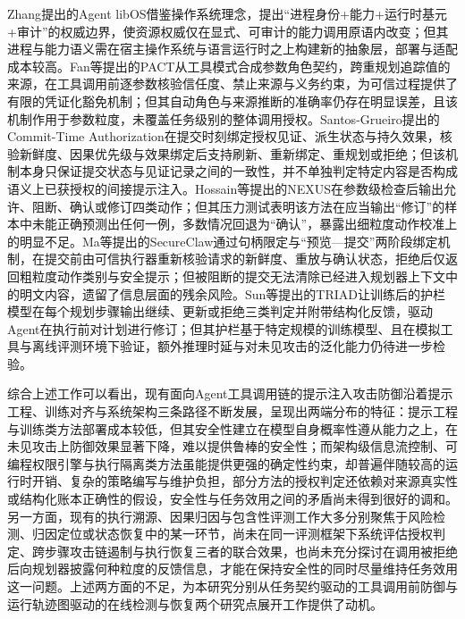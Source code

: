 Zhang\cite{zhang2026agentlibos}提出的Agent libOS借鉴操作系统理念，提出“进程身份+能力+运行时基元+审计”的权威边界，使资源权威仅在显式、可审计的能力调用原语内改变；但其进程与能力语义需在宿主操作系统与语言运行时之上构建新的抽象层，部署与适配成本较高。Fan等\cite{fan2026granularity}提出的PACT从工具模式合成参数角色契约，跨重规划追踪值的来源，在工具调用前逐参数核验信任度、禁止来源与义务约束，为可信过程提供了有限的凭证化豁免机制；但其自动角色与来源推断的准确率仍存在明显误差，且该机制作用于参数粒度，未覆盖任务级别的整体调用授权。Santos-Grueiro\cite{santosgrueiro2026temporary}提出的Commit-Time Authorization在提交时刻绑定授权见证、派生状态与持久效果，核验新鲜度、因果优先级与效果绑定后支持刷新、重新绑定、重规划或拒绝；但该机制本身只保证提交状态与见证记录之间的一致性，并不单独判定特定内容是否构成语义上已获授权的间接提示注入。Hossain等\cite{hossain2026nexus}提出的NEXUS在参数级检查后输出允许、阻断、确认或修订四类动作；但其压力测试表明该方法在应当输出“修订”的样本中未能正确预测出任何一例，多数情况回退为“确认”，暴露出细粒度动作校准上的明显不足。Ma等\cite{ma2026secureclaw}提出的SecureClaw通过句柄限定与“预览—提交”两阶段绑定机制，在提交前由可信执行器重新核验请求的新鲜度、重放与确认状态，拒绝后仅返回粗粒度动作类别与安全提示；但被阻断的提交无法清除已经进入规划器上下文中的明文内容，遗留了信息层面的残余风险。Sun等\cite{sun2026triad}提出的TRIAD让训练后的护栏模型在每个规划步骤输出继续、更新或拒绝三类判定并附带结构化反馈，驱动Agent在执行前对计划进行修订；但其护栏基于特定规模的训练模型、且在模拟工具与离线评测环境下验证，额外推理时延与对未见攻击的泛化能力仍待进一步检验。

综合上述工作可以看出，现有面向Agent工具调用链的提示注入攻击防御沿着提示工程、训练对齐与系统架构三条路径不断发展，呈现出两端分布的特征：提示工程与训练类方法部署成本较低，但其安全性建立在模型自身概率性遵从能力之上，在未见攻击上防御效果显著下降，难以提供鲁棒的安全性；而架构级信息流控制、可编程权限引擎与执行隔离类方法虽能提供更强的确定性约束，却普遍伴随较高的运行时开销、复杂的策略编写与维护负担，部分方法的授权判定还依赖对来源真实性或结构化账本正确性的假设，安全性与任务效用之间的矛盾尚未得到很好的调和。另一方面，现有的执行溯源、因果归因与包含性评测工作大多分别聚焦于风险检测、归因定位或状态恢复中的某一环节，尚未在同一评测框架下系统评估授权判定、跨步骤攻击链遏制与执行恢复三者的联合效果，也尚未充分探讨在调用被拒绝后向规划器披露何种粒度的反馈信息，才能在保持安全性的同时尽量维持任务效用这一问题。上述两方面的不足，为本研究分别从任务契约驱动的工具调用前防御与运行轨迹图驱动的在线检测与恢复两个研究点展开工作提供了动机。
